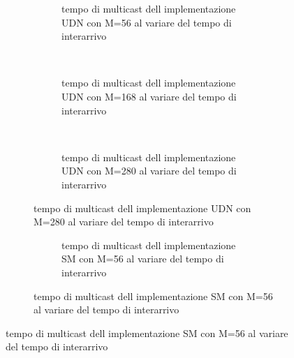 \documentclass[a4paper]{article}
\begin{document}
\begin{figure}[!h]
  \caption{Grafici del tempo di multicast al variare del tempo di interarrivo}
  \begin{subfigure}[b]{.5\columnwidth}
    \centering
    \renewcommand\thesubfigure{\alph{subfigure}}
    \caption{Implementazione con solo UDN}
    \begin{subfigure}[b]{\textwidth}
      \centering
      \addtocounter{subfigure}{-1}
      \renewcommand\thesubfigure{\alph{subfigure}1}
      \resizebox{\columnwidth}{!}{}
      \caption{tempo di multicast dell implementazione UDN con M=56 al variare del tempo di interarrivo}
      \label{fig:scalability_UDN_size56}
    \end{subfigure}
    ~
    \begin{subfigure}[b]{\textwidth}
      \centering
      \addtocounter{subfigure}{-1}
      \renewcommand\thesubfigure{\alph{subfigure}2}
      \resizebox{\columnwidth}{!}{}
      \caption{tempo di multicast dell implementazione UDN con M=168 al variare del tempo di interarrivo}
      \label{fig:scalability_UDN_size168}
    \end{subfigure}
    ~
    \begin{subfigure}[b]{\textwidth}
      \centering
      \addtocounter{subfigure}{-1}
      \renewcommand\thesubfigure{\alph{subfigure}3}
      \resizebox{\columnwidth}{!}{}
      \caption{tempo di multicast dell implementazione UDN con M=280 al variare del tempo di interarrivo}
      \label{fig:scalability_UDN_size280}
    \end{subfigure}
    \label{fig:allScalbility_UDN}
  \end{subfigure}
  \hspace{2ex}
  \begin{subfigure}[b]{.5\columnwidth}
    \centering
    \renewcommand\thesubfigure{\alph{subfigure}}
    \caption{Implementazione con solo SM}
    \begin{subfigure}[b]{\textwidth}
      \centering
      \addtocounter{subfigure}{-1}
      \renewcommand\thesubfigure{\alph{subfigure}1}
      \resizebox{\columnwidth}{!}{}
      \caption{tempo di multicast dell implementazione SM con M=56 al variare del tempo di interarrivo}
      \label{fig:scalability_SM_size56}
    \end{subfigure}

\end{subfigure}
\end{figure}
\end{document}
